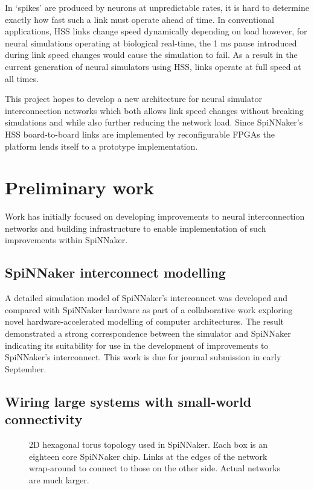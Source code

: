 	In `spikes' are produced by neurons at unpredictable rates, it is hard to
	determine exactly how fast such a link must operate ahead of time.  In
	conventional applications, HSS links change speed dynamically depending on
	load \cite{infinibandta08} however, for neural simulations operating at
	biological real-time, the 1 ms pause introduced during link speed changes
	\cite{xilinx14} would cause the simulation to fail. As a result in the current
	generation of neural simulators using HSS, links operate at full speed at all
	times.
	
	This project hopes to develop a new architecture for neural simulator
	interconnection networks which both allows link speed changes without breaking
	simulations and while also further reducing the network load. Since
	SpiNNaker's HSS board-to-board links are implemented by reconfigurable FPGAs
	the platform lends itself to a prototype implementation.

\section{Preliminary work}
	
	Work has initially focused on developing improvements to neural
	interconnection networks and building infrastructure to enable implementation
	of such improvements within SpiNNaker.
	
	\subsection{SpiNNaker interconnect modelling}
		
		A detailed simulation model of SpiNNaker's interconnect was developed and
		compared with SpiNNaker hardware as part of a collaborative work exploring
		novel hardware-accelerated modelling of computer architectures. The result
		demonstrated a strong correspondence between the simulator and SpiNNaker
		indicating its suitability for use in the development of improvements to
		SpiNNaker's interconnect. This work is due for journal submission in early
		September.
	
	\subsection{Wiring large systems with small-world connectivity}
		
		\begin{figure}
			\center
			
			
			\caption{2D hexagonal torus topology used in SpiNNaker. Each box is an
			eighteen core SpiNNaker chip. Links at the edges of the network
			wrap-around to connect to those on the other side. Actual networks are
			much larger.}
			\label{fig:spin-topology}
		\end{figure}
		
